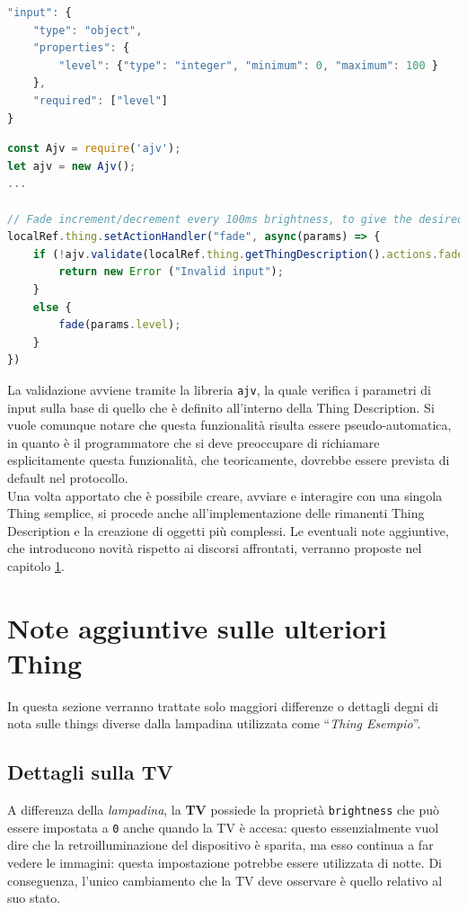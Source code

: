 \documentclass[12pt,a4paper,openright,oneside]{report}
\newcommand{\quotes}[1]{``#1''}
\begin{document}
\begin{lstlisting}[language=JavaScript]
"input": {
	"type": "object",
	"properties": {
		"level": {"type": "integer", "minimum": 0, "maximum": 100 }
	},
	"required": ["level"]
}
\end{lstlisting}

\begin{lstlisting}[language=JavaScript]
const Ajv = require('ajv');
let ajv = new Ajv();
...

// Fade increment/decrement every 100ms brightness, to give the desired value
localRef.thing.setActionHandler("fade", async(params) => {
	if (!ajv.validate(localRef.thing.getThingDescription().actions.fade.input, params)) {
		return new Error ("Invalid input");
	}
	else {
		fade(params.level);
	}
})
\end{lstlisting}

La validazione avviene tramite la libreria \texttt{ajv}, la quale verifica i parametri di input sulla base di quello che è definito all'interno della Thing Description. Si vuole comunque notare che questa funzionalità risulta essere pseudo-automatica, in quanto è il programmatore che si deve preoccupare di richiamare esplicitamente questa funzionalità, che teoricamente, dovrebbe essere prevista di default nel protocollo.\\

Una volta apportato che è possibile creare, avviare e interagire con una singola Thing semplice, si procede anche all'implementazione delle rimanenti Thing Description e la creazione di oggetti più complessi. Le eventuali note aggiuntive, che introducono novità rispetto ai discorsi affrontati, verranno proposte nel capitolo \ref{sec:other-things}.


\section{Note aggiuntive sulle ulteriori Thing}
\label{sec:other-things}
In questa sezione verranno trattate solo maggiori differenze o dettagli degni di nota sulle things diverse dalla lampadina utilizzata come \quotes{\textit{Thing Esempio}}.


\subsection{Dettagli sulla TV}
A differenza della \textit{lampadina}, la \textbf{TV} possiede la proprietà \texttt{brightness} che può essere impostata a \texttt{0} anche quando la TV è accesa: questo essenzialmente vuol dire che la retroilluminazione del dispositivo è sparita, ma esso continua a far vedere le immagini: questa impostazione potrebbe essere utilizzata di notte. Di conseguenza, l'unico cambiamento che la TV deve osservare è quello relativo al suo stato.\\
\end{document}
